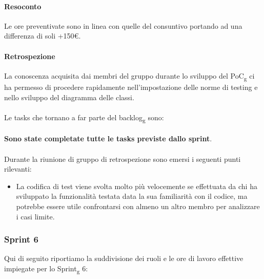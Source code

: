 \paragraph{Resoconto}
Le ore preventivate sono in linea con quelle del consuntivo portando ad una differenza di soli +150\euro.

\paragraph{Retrospezione}
La conoscenza acquisita dai membri del gruppo durante lo sviluppo del PoC\textsubscript{g} ci ha permesso di procedere rapidamente nell'impostazione delle norme di testing e nello sviluppo del diagramma delle classi. 
\\\\
Le tasks che tornano a far parte del backlog\textsubscript{g} sono:
\\\\
\textbf{Sono state completate tutte le tasks previste dallo sprint}.
\\\\
\noindent Durante la riunione di gruppo di retrospezione sono emersi i seguenti punti rilevanti:
\begin{itemize}
	\item La codifica di test viene svolta molto più velocemente se effettuata da chi ha sviluppato la funzionalità testata data la sua familiarità con il codice, ma potrebbe essere utile confrontarsi con almeno un altro membro per analizzare i casi limite.
\end{itemize}


\subsubsection{Sprint 6}
Qui di seguito riportiamo la suddivisione dei ruoli e le ore di lavoro effettive impiegate per lo Sprint\textsubscript{g} 6:


